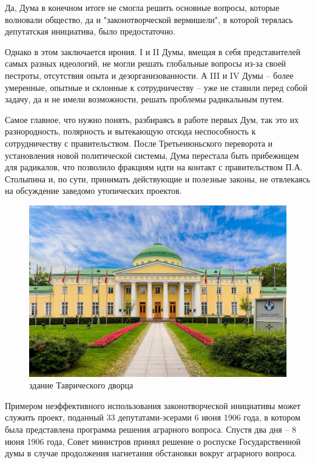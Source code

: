 Да, Дума в конечном итоге не смогла решить основные вопросы, которые волновали общество, да и "законотворческой вермишели", в которой терялась депутатская инициатива, было предостаточно.

Однако в этом заключается ирония. I и II Думы, вмещая в себя представителей самых разных идеологий, не могли решать глобальные вопросы из-за своей пестроты, отсутствия опыта и дезорганизованности. А III и IV Думы – более умеренные, опытные и склонные к сотрудничеству – уже не ставили перед собой задачу, да и не имели возможности, решать проблемы радикальным путем.

Самое главное, что нужно понять, разбираясь в работе первых Дум, так это их разнородность, полярность и вытекающую отсюда неспособность к сотрудничеству с правительством. После Третьеиюньского переворота и установления новой политической системы, Дума перестала быть прибежищем для радикалов, что позволило фракциям идти на контакт с правительством П.А. Столыпина и, по сути, принимать действующие и полезные законы, не отвлекаясь на обсуждение заведомо утопических проектов.

\begin{figure}[h!tb] 
	\centering\includegraphics[scale=0.3]{Data/Vybory_V_Dumu/MJ-rW_oCmBM.jpg}
	\caption{здание Таврического дворца}%
\end{figure}


Примером неэффективного использования законотворческой инициативы может служить проект, поданный 33 депутатами-эсерами 6 июня 1906 года, в котором была представлена программа решения аграрного вопроса. Спустя два дня – 8 июня 1906 года, Совет министров принял решение о роспуске Государственной думы в случае продолжения нагнетания обстановки вокруг аграрного вопроса.

